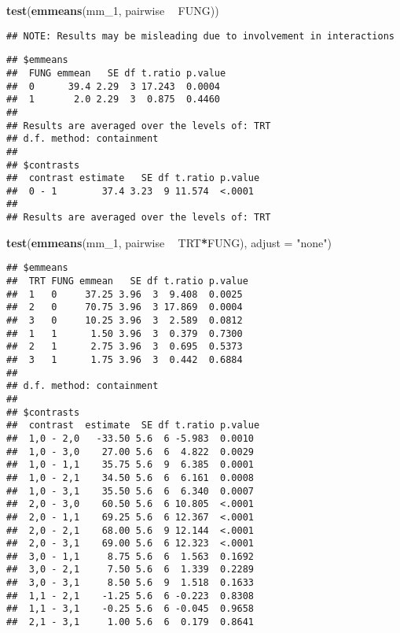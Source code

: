 \documentclass[]{book}
\newenvironment{Shaded}{\begin{snugshade}}{\end{snugshade}}
\newcommand{\DataTypeTok}[1]{\textcolor[rgb]{0.13,0.29,0.53}{#1}}
\newcommand{\DecValTok}[1]{\textcolor[rgb]{0.00,0.00,0.81}{#1}}
\newcommand{\KeywordTok}[1]{\textcolor[rgb]{0.13,0.29,0.53}{\textbf{#1}}}
\newcommand{\NormalTok}[1]{#1}
\newcommand{\OperatorTok}[1]{\textcolor[rgb]{0.81,0.36,0.00}{\textbf{#1}}}
\newcommand{\StringTok}[1]{\textcolor[rgb]{0.31,0.60,0.02}{#1}}
\begin{document}
\begin{Shaded}
\begin{Highlighting}[]
\KeywordTok{test}\NormalTok{(}\KeywordTok{emmeans}\NormalTok{(mm_}\DecValTok{1}\NormalTok{, pairwise }\OperatorTok{~}\StringTok{ }\NormalTok{FUNG))}
\end{Highlighting}
\end{Shaded}

\begin{verbatim}
## NOTE: Results may be misleading due to involvement in interactions
\end{verbatim}

\begin{verbatim}
## $emmeans
##  FUNG emmean   SE df t.ratio p.value
##  0      39.4 2.29  3 17.243  0.0004 
##  1       2.0 2.29  3  0.875  0.4460 
## 
## Results are averaged over the levels of: TRT 
## d.f. method: containment 
## 
## $contrasts
##  contrast estimate   SE df t.ratio p.value
##  0 - 1        37.4 3.23  9 11.574  <.0001 
## 
## Results are averaged over the levels of: TRT
\end{verbatim}

\begin{Shaded}
\begin{Highlighting}[]
\KeywordTok{test}\NormalTok{(}\KeywordTok{emmeans}\NormalTok{(mm_}\DecValTok{1}\NormalTok{, pairwise }\OperatorTok{~}\StringTok{ }\NormalTok{TRT}\OperatorTok{*}\NormalTok{FUNG), }\DataTypeTok{adjust =} \StringTok{"none"}\NormalTok{)}
\end{Highlighting}
\end{Shaded}

\begin{verbatim}
## $emmeans
##  TRT FUNG emmean   SE df t.ratio p.value
##  1   0     37.25 3.96  3  9.408  0.0025 
##  2   0     70.75 3.96  3 17.869  0.0004 
##  3   0     10.25 3.96  3  2.589  0.0812 
##  1   1      1.50 3.96  3  0.379  0.7300 
##  2   1      2.75 3.96  3  0.695  0.5373 
##  3   1      1.75 3.96  3  0.442  0.6884 
## 
## d.f. method: containment 
## 
## $contrasts
##  contrast  estimate  SE df t.ratio p.value
##  1,0 - 2,0   -33.50 5.6  6 -5.983  0.0010 
##  1,0 - 3,0    27.00 5.6  6  4.822  0.0029 
##  1,0 - 1,1    35.75 5.6  9  6.385  0.0001 
##  1,0 - 2,1    34.50 5.6  6  6.161  0.0008 
##  1,0 - 3,1    35.50 5.6  6  6.340  0.0007 
##  2,0 - 3,0    60.50 5.6  6 10.805  <.0001 
##  2,0 - 1,1    69.25 5.6  6 12.367  <.0001 
##  2,0 - 2,1    68.00 5.6  9 12.144  <.0001 
##  2,0 - 3,1    69.00 5.6  6 12.323  <.0001 
##  3,0 - 1,1     8.75 5.6  6  1.563  0.1692 
##  3,0 - 2,1     7.50 5.6  6  1.339  0.2289 
##  3,0 - 3,1     8.50 5.6  9  1.518  0.1633 
##  1,1 - 2,1    -1.25 5.6  6 -0.223  0.8308 
##  1,1 - 3,1    -0.25 5.6  6 -0.045  0.9658 
##  2,1 - 3,1     1.00 5.6  6  0.179  0.8641
\end{verbatim}
\end{document}
